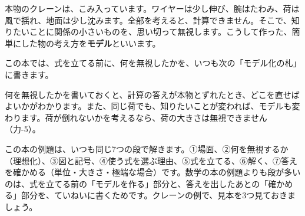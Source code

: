 \leavevmode\label{ph:力-0:sec4}本物のクレーンは、こみ入っています。ワイヤーは少し伸び、腕はたわみ、荷は風で揺れ、地面は少し沈みます。全部を考えると、計算できません。そこで、知りたいことに関係の小さいものを、思い切って無視します。こうして作った、簡単にした物の考え方を\textbf{モデル}といいます。

この本では、式を立てる前に、何を無視したかを、いつも次の「モデル化の札」に書きます。
\begin{phmodel}[つり上げる荷]
\end{phmodel}
何を無視したかを書いておくと、計算の答えが本物とずれたとき、どこを直せばよいかがわかります。また、同じ荷でも、知りたいことが変われば、モデルも変わります。荷が倒れないかを考えるなら、荷の大きさは無視できません（力-5）。

\leavevmode\label{ph:力-0:sec5}この本の例題は、いつも同じ7つの段で解きます。①場面、②何を無視するか（理想化）、③図と記号、④使う式を選ぶ理由、⑤式を立てる、⑥解く、⑦答えを確かめる（単位・大きさ・極端な場合）です。数学の本の例題よりも段が多いのは、式を立てる前の「モデルを作る」部分と、答えを出したあとの「確かめる」部分を、ていねいに書くためです。クレーンの例で、見本を3つ見ておきましょう。

